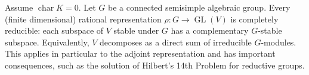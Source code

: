 Assume $\operatorname{char} K = 0$. Let $G$ be a connected semisimple algebraic group. Every (finite dimensional) rational representation $\rho: G \to \operatorname{GL}(V)$ is completely reducible: each subspace of $V$ stable under $G$ has a complementary $G$-stable subspace. Equivalently, $V$ decomposes as a direct sum of irreducible $G$-modules. This applies in particular to the adjoint representation and has important consequences, such as the solution of Hilbert's 14th Problem for reductive groups.
